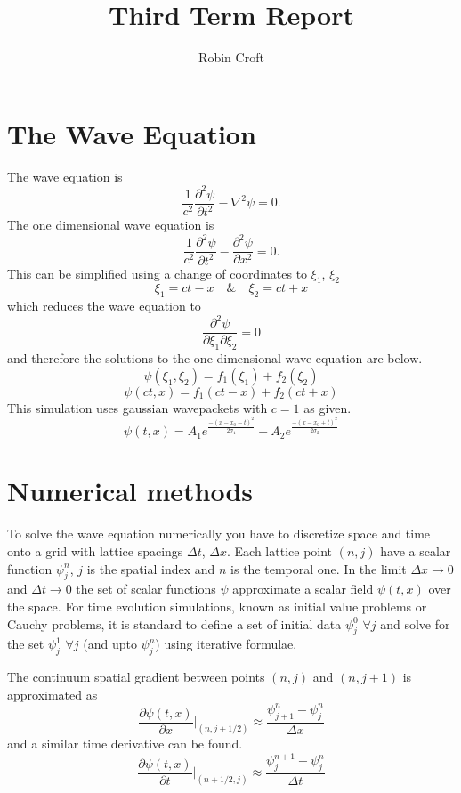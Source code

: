 \documentclass[11pt, oneside]{report}  %
\title{Third Term Report}
\author{Robin Croft}
\numberwithin{equation}{section}
\begin{document}
\tableofcontents
\newpage


\section{The Wave Equation}
The wave equation is
$$\frac{1}{c^2}  \frac{\partial^2 \psi}{\partial t^2} - \nabla^2 \psi=0.$$
The one dimensional wave equation is  
$$ \frac{1}{c^2} \frac{\partial^2 \psi}{\partial t^2} - \frac{\partial^2 \psi}{\partial x^2}=0.$$
This can be simplified using a change of coordinates to $\xi_1$, $\xi_2$
$$ \xi_1 = ct-x \quad \& \quad \xi_2 = ct+x $$
which reduces the wave equation to 
$$\boxed{ \frac{\partial^2 \psi}{\partial \xi_1 \partial \xi_2}=0}$$
and therefore the solutions to the one dimensional wave equation are below.
$$\psi(\xi_1,\xi_2) =  f_1(\xi_1) + f_2(\xi_2) $$
$$\psi(ct,x) =  f_1(ct-x) + f_2(ct+x) $$
This simulation uses gaussian wavepackets with $c=1$ as given.
$$ \psi(t,x) = A_1 e^{\frac{-(x-x_0 - t)^2}{2\sigma_1}} + A_2 e^{\frac{-(x-x_0 + t)^2}{2\sigma_2}}$$ 

\section{Numerical methods}
To solve the wave equation numerically you have to discretize space and time onto a grid with lattice spacings $\Delta t$, $\Delta x$. Each lattice point $(n,j)$ have a scalar function $\psi^n_j$, $j$ is the spatial index and $n$ is the temporal one. In the limit $\Delta x \rightarrow 0$ and $\Delta t \rightarrow 0$ the set of scalar functions $\psi$ approximate a scalar field $\psi(t,x)$ over the space. For time evolution simulations, known as initial value problems or Cauchy problems, it is standard to define a set of initial data 
$ \psi_{j}^0$ $\forall j$ and solve for the set $ \psi_{j}^1$ $\forall j$ (and upto $\psi^n_j$) using iterative formulae.

 The continuum spatial gradient between points $(n,j)$ and $(n,j+1)$ is approximated as
$$ \frac{\partial \psi(t,x)}{\partial x}\Bigg|_{(n,j+1/2)} \approx \frac{\psi^n_{j+1}-\psi^n_j}{\Delta x}$$
and a similar time derivative can be found.
$$ \frac{\partial \psi(t,x)}{\partial t}\Bigg|_{(n+1/2,j)} \approx \frac{\psi^{n+1}_{j}-\psi^n_j}{\Delta t}$$
\end{document}
